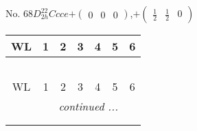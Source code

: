 \documentclass[fleqn,9pt,landscape]{jsarticle}
\begin{document}
\newpage
No. 68\quad$D_{2h}^{22}$\quad$Ccce$\quad[ orthorhombic ]\quad$+\begin{pmatrix} 0 & 0 & 0 \end{pmatrix}$,\quad $+\begin{pmatrix} \frac{1}{2} & \frac{1}{2} & 0 \end{pmatrix}$
\begin{center}
\renewcommand{\arraystretch}{1.2}
\begin{longtable}{ccccccc}
 \hline \hline
WL & 1 & 2 & 3 & 4 & 5 & 6 \\ \hline \endfirsthead

\multicolumn{6}{l}{\tablename\ \thetable{}} \\
 \hline \hline
WL & 1 & 2 & 3 & 4 & 5 & 6 \\ \hline \endhead

 \hline \hline
\multicolumn{6}{r}{\footnotesize\it continued ...} \\ \endfoot

 \hline \hline
\multicolumn{6}{r}{} \\ \endlastfoot


\end{longtable}
\end{center}
\end{document}
